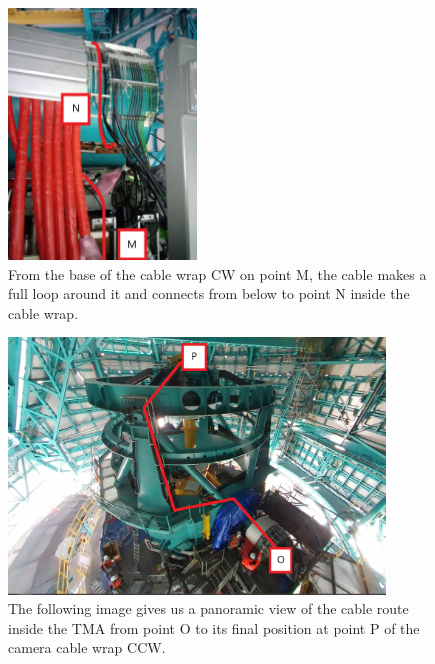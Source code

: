   \begin{figure}
    \centering
    \includegraphics[width=5cm]{images/28.jpg}
    \caption*{From the base of the cable wrap CW on point M, the cable makes a full loop around it and connects from below to point N inside the cable wrap.}
  \end{figure}
  \vspace{5 mm}
  \begin{figure}
    \centering
    \includegraphics[width=10cm]{images/33.png}
    \caption*{The following image gives us a panoramic view of the cable route inside the TMA from point O to its final position at point P of the camera cable wrap CCW.}
  \end{figure}

\newpage

